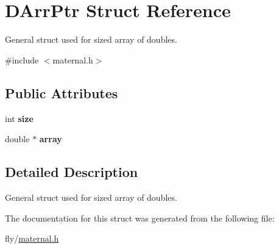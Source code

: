 \hypertarget{structDArrPtr}{
\section{DArrPtr Struct Reference}
\label{structDArrPtr}
}


General struct used for sized array of doubles.  


{\ttfamily \#include $<$maternal.h$>$}\subsection*{Public Attributes}
\begin{DoxyCompactItemize}
\item 
\hypertarget{structDArrPtr_a144584afb46486a3fd2ac001b94019e2}{
int {\bfseries size}}
\label{structDArrPtr_a144584afb46486a3fd2ac001b94019e2}

\item 
\hypertarget{structDArrPtr_a33ecc0b9d9ba6e0ef6990f9463d3eea9}{
double $\ast$ {\bfseries array}}
\label{structDArrPtr_a33ecc0b9d9ba6e0ef6990f9463d3eea9}

\end{DoxyCompactItemize}


\subsection{Detailed Description}
General struct used for sized array of doubles. 

The documentation for this struct was generated from the following file:\begin{DoxyCompactItemize}
\item 
fly/\hyperlink{maternal_8h}{maternal.h}\end{DoxyCompactItemize}
